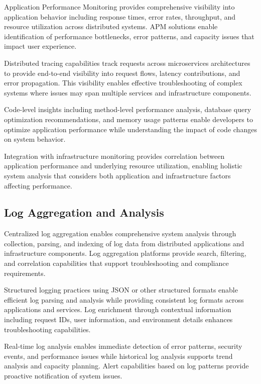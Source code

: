 Application Performance Monitoring provides comprehensive visibility into application behavior including response times, error rates, throughput, and resource utilization across distributed systems. APM solutions enable identification of performance bottlenecks, error patterns, and capacity issues that impact user experience.

Distributed tracing capabilities track requests across microservices architectures to provide end-to-end visibility into request flows, latency contributions, and error propagation. This visibility enables effective troubleshooting of complex systems where issues may span multiple services and infrastructure components.

Code-level insights including method-level performance analysis, database query optimization recommendations, and memory usage patterns enable developers to optimize application performance while understanding the impact of code changes on system behavior.

Integration with infrastructure monitoring provides correlation between application performance and underlying resource utilization, enabling holistic system analysis that considers both application and infrastructure factors affecting performance.

\subsection{Log Aggregation and Analysis}

Centralized log aggregation enables comprehensive system analysis through collection, parsing, and indexing of log data from distributed applications and infrastructure components. Log aggregation platforms provide search, filtering, and correlation capabilities that support troubleshooting and compliance requirements.

Structured logging practices using JSON or other structured formats enable efficient log parsing and analysis while providing consistent log formats across applications and services. Log enrichment through contextual information including request IDs, user information, and environment details enhances troubleshooting capabilities.

Real-time log analysis enables immediate detection of error patterns, security events, and performance issues while historical log analysis supports trend analysis and capacity planning. Alert capabilities based on log patterns provide proactive notification of system issues.

